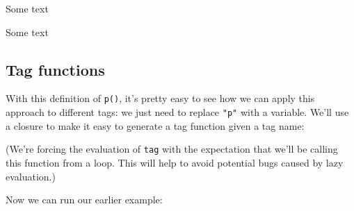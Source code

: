 Some text

\begin{Shaded}
\begin{Highlighting}[]
\NormalTok{(}\NormalTok{, } \NormalTok{, }\NormalTok{ =}\StringTok{ }\NormalTok{)}
\end{Highlighting}
\end{Shaded}

Some text

\hypertarget{tag-functions}{%
\subsection{Tag functions}\label{tag-functions}}

With this definition of \texttt{p()}, it's pretty easy to see how we can
apply this approach to different tags: we just need to replace
\texttt{"p"} with a variable. We'll use a closure to make it easy to
generate a tag function given a tag name:

\begin{Shaded}
\begin{Highlighting}[]
\StringTok{ }
\StringTok{ }
\StringTok{ }\NormalTok{(}
\StringTok{ }\NormalTok{(}\NormalTok{(}

    \NormalTok{(}\NormalTok{(}
      \NormalTok{,}
       \NormalTok{),}
\NormalTok{    ))}
\NormalTok{  \}}
\NormalTok{\}}
\end{Highlighting}
\end{Shaded}

(We're forcing the evaluation of \texttt{tag} with the expectation that
we'll be calling this function from a loop. This will help to avoid
potential bugs caused by lazy evaluation.)

Now we can run our earlier example:

